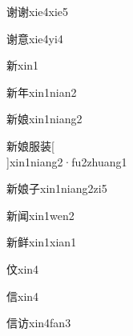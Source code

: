 \begin{verbete}[12;12]{谢谢}{xie4xie5}
\end{verbete}

\begin{verbete}[12;13]{谢意}{xie4yi4}
\end{verbete}

\begin{verbete}[13]{新}{xin1}
\end{verbete}

\begin{verbete*}[13;6]{新年}{xin1nian2}
\end{verbete*}

\begin{verbete}[13;10]{新娘}{xin1niang2}
\end{verbete}

\begin{verbete}[13;10;8;12]{新娘服装}[\\]{xin1niang2·fu2zhuang1}
\end{verbete}

\begin{verbete}[13;10;3]{新娘子}{xin1niang2zi5}
\end{verbete}

\begin{verbete}[13;9]{新闻}{xin1wen2}
\end{verbete}

\begin{verbete}[13;14]{新鲜}{xin1xian1}
\end{verbete}

\begin{verbete}[6]{伩}{xin4}
\end{verbete}

\begin{verbete}[9]{信}{xin4}
\end{verbete}

\begin{verbete}[9;6]{信访}{xin4fan3}
\end{verbete}

